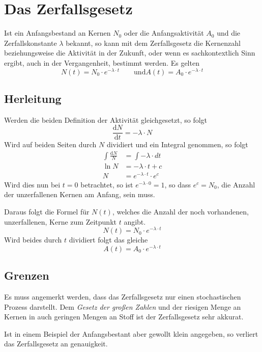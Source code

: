 \documentclass{article}
\newcommand{\dd}{\text{d}}
\begin{document}
 
\section{Das Zerfallsgesetz}
Ist ein Anfangsbestand an Kernen $N_0$ oder die Anfangsaktivität $A_0$ und die Zerfallskonstante $\lambda$ bekannt, so kann mit dem Zerfallsgesetz die Kernenzahl beziehungsweise die Aktivität in der Zukunft, oder wenn es sachkontextlich Sinn ergibt, auch in der Vergangenheit, bestimmt werden. Es gelten
\[
 N(t) = N_0 \cdot e^{-\lambda \cdot t} 
 \qquad \text{und}
 A(t) = A_0 \cdot e^{-\lambda \cdot t}  
\] 
\subsection{Herleitung} 
Werden die beiden Definition der Aktivität gleichgesetzt, so folgt 
\[
 \frac{\dd N}{\dd t} = -\lambda \cdot N 
\]
Wird auf beiden Seiten durch $N$ dividiert und ein Integral genommen, so folgt
\begin{align*} 
 \int \frac{\dd N}{N} &= \int -\lambda \cdot dt \\ 
 \ln{N} &= -\lambda \cdot t + c \\
 N &= e^{-\lambda \cdot t} \cdot e^c
\end{align*}
Wird dies nun bei $t=0$ betrachtet, so ist $e^{-\lambda \cdot 0} = 1$, so dass $e^c=N_0$, die Anzahl der unzerfallenen Kernen am Anfang, sein muss.
 
Daraus folgt die Formel für $N(t)$, welches die Anzahl der noch vorhandenen, unzerfallenen, Kerne zum Zeitpunkt $t$ angibt.
\[
 N(t) = N_0 \cdot e^{-\lambda \cdot t} 
\]
Wird beides durch $t$ dividiert folgt das gleiche 
\[
 A(t) = A_0 \cdot e^{-\lambda \cdot t} 
\]
 
\subsection{Grenzen} 
Es muss angemerkt werden, dass das Zerfallsgesetz nur einen stochastischen Prozess darstellt. Dem \emph{Gesetz der großen Zahlen} und der riesigen Menge an Kernen in auch geringen Mengen an Stoff ist der Zerfallsgesetz sehr akkurat.
 
Ist in einem Beispiel der Anfangsbestant aber gewollt klein angegeben, so verliert das Zerfallsgesetz an genauigkeit.  
\end{document}
